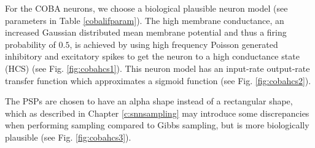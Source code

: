 For the COBA neurons, we choose a biological plausible neuron model (see parameters in Table \ref{cobalifparam}). 
The high membrane conductance, an increased Gaussian distributed mean membrane potential and thus a firing probability of $0.5$, is achieved by using high frequency Poisson generated inhibitory and excitatory spikes to get the neuron to a high conductance state (HCS) (see Fig. \ref{fig:cobahcs1}). 
This neuron model has an input-rate output-rate transfer function which approximates a sigmoid function (see Fig. \ref{fig:cobahcs2}).

The PSPs are chosen to have an alpha shape instead of a rectangular shape, which as described in Chapter \ref{c:snnsampling} may introduce some discrepancies when performing sampling compared to Gibbs sampling, but is more biologically plausible (see Fig. \ref{fig:cobahcs3}).

